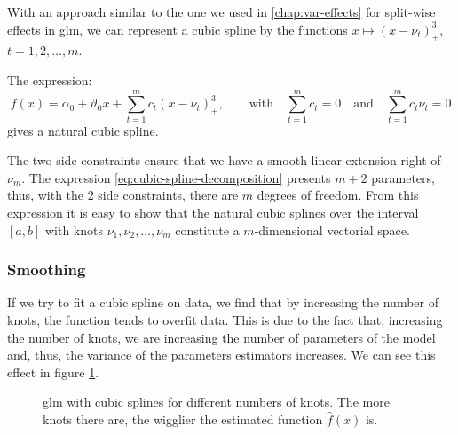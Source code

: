 \documentclass[a4paper, twoside, openright, 12pt]{report}
\theoremstyle{definition}
\theoremstyle{definition}
\theoremstyle{definition}
\theoremstyle{remark}
\begin{document}
With an approach similar to the one we used in \ref{chap:var-effects} for split-wise effects in \ac{glm}, we can represent a cubic spline by the functions \(x \mapsto \left( x-\nu_t \right)_+^3\), \(t=1,2,\dots,m\).

The expression:
\begin{equation}
\label{eq:cubic-spline-decomposition}
f(x) = \alpha_0 + \vartheta_0 x + \sum_{t=1}^{m}{c_t \left( x-\nu_t \right)_+^3}, \qquad \text{with} \quad \sum_{t=1}^{m}{c_t} = 0 \quad \text{and} \quad \sum_{t=1}^{m}{c_t\nu_t} = 0
\end{equation}
gives a natural cubic spline.

The two side constraints ensure that we have a smooth linear extension right of \(\nu_m\). The expression \eqref{eq:cubic-spline-decomposition} presents \(m+2\) parameters, thus, with the 2 side constraints, there are \(m\) degrees of freedom. From this expression it is easy to show that the natural cubic splines over the interval \([a,b]\) with knots \(\nu_1, \nu_2, \dots, \nu_m\) constitute a \(m\)-dimensional vectorial space.

\hypertarget{smoothing}{%
\subsubsection{Smoothing}\label{smoothing}}

If we try to fit a cubic spline on data, we find that by increasing the number of knots, the function tends to overfit data. This is due to the fact that, increasing the number of knots, we are increasing the number of parameters of the model and, thus, the variance of the parameters estimators increases. We can see this effect in figure \ref{fig:cub-spline}.







\begin{figure}[!hbtp]

{\centering {}\newline{}

}

\caption[\ac{glm} with cubic splines for different numbers of knots.]{\ac{glm} with cubic splines for different numbers of knots. The more knots there are, the wigglier the estimated function \(\hat{f}(x)\) is.}\label{fig:cub-spline}
\end{figure}
\end{document}
